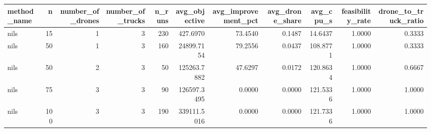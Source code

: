 \begin{tabular}{lrrrrrrrrrr}
\toprule
method_name & n & number_of_drones & number_of_trucks & n_runs & avg_objective & avg_improvement_pct & avg_drone_share & avg_cpu_s & feasibility_rate & drone_to_truck_ratio \\
\midrule
nils & 15 & 1 & 3 & 230 & 427.6970 & 73.4540 & 0.1487 & 14.6437 & 1.0000 & 0.3333 \\
nils & 50 & 1 & 3 & 160 & 24899.7154 & 79.2556 & 0.0437 & 108.8771 & 1.0000 & 0.3333 \\
nils & 50 & 2 & 3 & 50 & 125263.7882 & 47.6297 & 0.0172 & 120.8634 & 1.0000 & 0.6667 \\
nils & 75 & 3 & 3 & 90 & 126597.3495 & 0.0000 & 0.0000 & 121.5336 & 1.0000 & 1.0000 \\
nils & 100 & 3 & 3 & 190 & 339111.5016 & 0.0000 & 0.0000 & 121.7336 & 1.0000 & 1.0000 \\
\bottomrule
\end{tabular}
